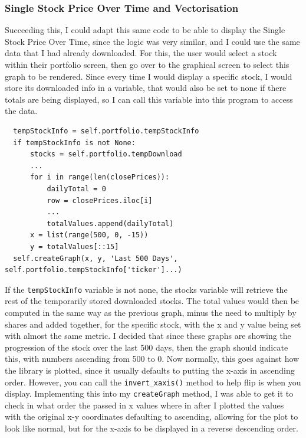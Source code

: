 \documentclass{article}
\begin{document}
\subsubsection{Single Stock Price Over Time and Vectorisation}
Succeeding this, I could adapt this same code to be able to display the Single Stock Price Over Time, since the logic was very similar, and I could use the same data that I had already downloaded. For this, the user would select a stock within their portfolio screen, then go over to the graphical screen to select this graph to be rendered. Since every time I would display a specific stock, I would store its downloaded info in a variable, that would also be set to none if there totals are being displayed, so I can call this variable into this program to access the data.\\\vspace{0.3cm}

\begin{verbatim}
  tempStockInfo = self.portfolio.tempStockInfo
  if tempStockInfo is not None:
      stocks = self.portfolio.tempDownload
      ...
      for i in range(len(closePrices)):
          dailyTotal = 0
          row = closePrices.iloc[i]
          ...
          totalValues.append(dailyTotal)
      x = list(range(500, 0, -15)) 
      y = totalValues[::15]
  self.createGraph(x, y, 'Last 500 Days', self.portfolio.tempStockInfo['ticker']...)
\end{verbatim}

\vspace{0.3cm}
If the \texttt{tempStockInfo} variable is not none, the stocks variable will retrieve the rest of the temporarily stored downloaded stocks. The total values would then be computed in the same way as the previous graph, minus the need to multiply by shares and added together, for the specific stock, with the x and y value being set with almost the same metric. I decided that since these graphs are showing the progression of the stock over the last 500 days, then the graph should indicate this, with numbers ascending from 500 to 0. Now normally, this goes against how the library is plotted, since it usually defaults to putting the x-axis in ascending order. However, you can call the \texttt{invert\_xaxis()} method to help flip is when you display. Implementing this into my \texttt{createGraph} method, I was able to get it to check in what order the passed in x values where in after I plotted the values with the original x-y coordinates defaulting to ascending, allowing for the plot to look like normal, but for the x-axis to be displayed in a reverse descending order.\\\vspace{0.3cm}
\end{document}
